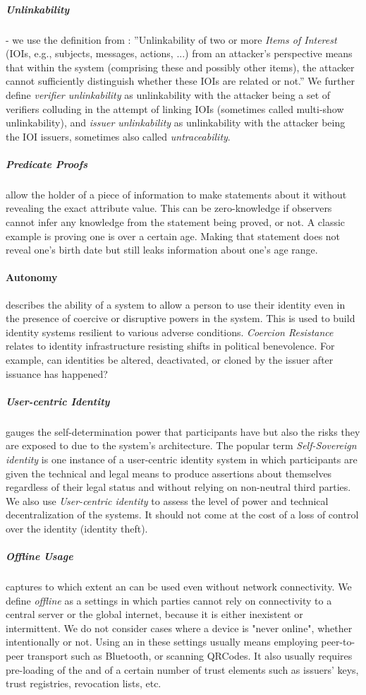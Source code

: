 \subparagraph{Unlinkability} - we use the definition from \cite{ph10}: ''Unlinkability of two or more \emph{Items of Interest} (IOIs, e.g., subjects, messages, actions, ...)
from an attacker’s perspective means that within the system (comprising these and
possibly other items), the attacker cannot sufficiently distinguish whether these IOIs are
related or not.''
We further define \emph{verifier unlinkability} as unlinkability with the attacker being a set of verifiers colluding in the attempt of linking IOIs (sometimes called multi-show unlinkability), and \emph{issuer unlinkability} as unlinkability with the attacker being the IOI issuers, sometimes also called \emph{untraceability}.


\subparagraph{Predicate Proofs} allow the holder of a piece of information to make statements about it without revealing the exact attribute value. This can be zero-knowledge if observers cannot infer any knowledge from the statement being proved, or not. A classic example is proving one is over a certain age. Making that statement does not reveal one's birth date but still leaks information about one's age range.


\paragraph{Autonomy} describes the ability of a system to allow a person to use their identity even in the presence of coercive or disruptive powers in the system. 
This is used to build identity systems resilient to various adverse conditions.
\emph{Coercion Resistance} relates to identity infrastructure resisting shifts in political benevolence. For example, can identities be altered, deactivated, or cloned by the issuer after issuance has happened?


\subparagraph{User-centric Identity} gauges the self-determination power that participants have but also the risks they are exposed to due to the system's architecture.
The popular term \emph{Self-Sovereign identity} is one instance of a user-centric identity system in which participants are given the technical and legal means to produce assertions about themselves regardless of their legal status and without relying on non-neutral third parties.
We also use \emph{User-centric identity} to assess the level of power and technical decentralization of the systems. 
It should not come at the cost of a loss of control over the identity (identity theft).

\subparagraph{Offline Usage} captures to which extent an \eid can be used even without network connectivity.
We define \emph{offline} as a settings in which parties cannot rely on connectivity to a central server or the global internet, because it is either inexistent or intermittent. We do not consider cases where a device is "never online", whether intentionally or not. Using an \eid in these settings usually means employing peer-to-peer transport such as Bluetooth, or scanning QRCodes. It also usually requires pre-loading of the \eid and of a certain number of trust elements such as issuers' keys, trust registries, revocation lists, etc.

